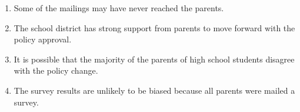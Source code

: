 \documentclass[10pt]{article}\usepackage[]{graphicx}\usepackage[]{color}
\begin{document}
\begin{enumerate}
\begin{enumerate}
\item Some of the mailings may have never reached the parents.
\item The school district has strong support from parents to move forward with the policy approval.
\item It is possible that the majority of the parents of high school students disagree with the policy change.
\item The survey results are unlikely to be biased because all parents were mailed a survey. 
\end{enumerate}

\end{enumerate}

% 
% 
 
\end{document}
